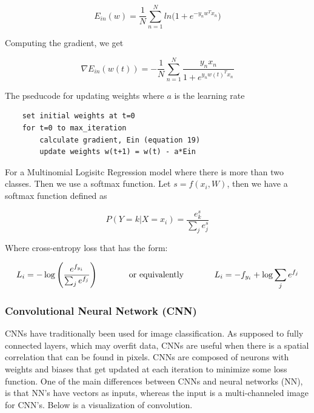 \documentclass[12pt]{article}
\begin{document}
\begin{equation}
    \label{eq:3}
    E_{in}(w) = \frac{1}{N} \sum_{n=1}^N ln\big(1 + e^{ -y_n w^T x_n } \big)
\end{equation}

Computing the gradient, we get

\begin{equation}
    \label{eq:3}
    \nabla E_{in}(w(t)) = - \frac{1}{N} \sum_{n=1}^N \frac{y_n x_n}{1 + e^{ y_n w(t)^T x_n } }
\end{equation}


The pseducode for updating weights where $a$ is the learning rate
\begin{verbatim}
    set initial weights at t=0
    for t=0 to max_iteration
        calculate gradient, Ein (equation 19)
        update weights w(t+1) = w(t) - a*Ein
\end{verbatim}


For a Multinomial Logisitc Regression model where there is more than two classes. Then we use a softmax function. Let $s = f(x_i, W)$, then we have a softmax function defined as 

\begin{equation}
P(Y=k|X=x_i) = \frac{e^s_k}{\sum_j e^s_j}
\end{equation}

Where cross-entropy loss that has the form:

\begin{equation}
L_i = -\log\left(\frac{e^{f_{y_i}}}{ \sum_j e^{f_j} }\right) \hspace{0.5in} \text{or equivalently} \hspace{0.5in} L_i = -f_{y_i} + \log\sum_j e^{f_j}
\end{equation}



\subsubsection{Convolutional Neural Network (CNN)}


CNNs have traditionally been used for image classification. As supposed to fully connected layers, which may overfit data, CNNs are useful when there is a spatial correlation that can be found in pixels. CNNs are composed of neurons with weights and biases that get updated at each iteration to minimize some loss function. One of the main differences between CNNs and neural networks (NN), is that NN's have vectors as inputs, whereas the input is a multi-channeled image for CNN's. Below is a visualization of convolution.
\end{document}
